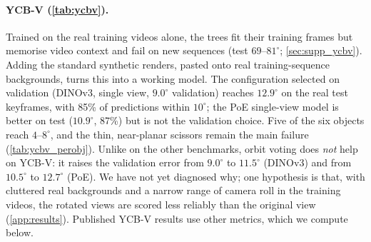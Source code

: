 \paragraph{YCB-V (\cref{tab:ycbv}).} Trained on the real training videos alone, the trees fit their training frames but memorise video context and fail on new sequences (test $69$--$81^\circ$; \cref{sec:supp_ycbv}). Adding the standard synthetic renders, pasted onto real training-sequence backgrounds, turns this into a working model. The configuration selected on validation (DINOv3, single view, $9.0^\circ$ validation) reaches $12.9^\circ$ on the real test keyframes, with 85\% of predictions within $10^\circ$; the PoE single-view model is better on test ($10.9^\circ$, 87\%) but is not the validation choice. Five of the six objects reach $4$--$8^\circ$, and the thin, near-planar scissors remain the main failure (\cref{tab:ycbv_perobj}). Unlike on the other benchmarks, orbit voting does \emph{not} help on YCB-V: it raises the validation error from $9.0^\circ$ to $11.5^\circ$ (DINOv3) and from $10.5^\circ$ to $12.7^\circ$ (PoE). We have not yet diagnosed why; one hypothesis is that, with cluttered real backgrounds and a narrow range of camera roll in the training videos, the rotated views are scored less reliably than the original view (\cref{app:results}). Published YCB-V results use other metrics, which we compute below.

\begin{table}[t]
  \centering\footnotesize
  \setlength{\tabcolsep}{3.5pt}
  \resizebox{\linewidth}{!}{}
  \caption{\textbf{YCB-V with the literature's metrics} (\%, higher is better), per object on the standard real keyframes. Published rows come from each paper's own tables, $^\ddagger$\,through the table of~\cite{wang2021gdrnet}. These six objects are non-symmetric in this protocol, so ADD(-S) equals ADD for them. ``Mean (6)'' is our average of the published per-object values over our six objects; ``mean (21)'' is the published mean over all 21 objects, which includes symmetric objects and is not comparable with mean (6). Ours: DINOv3 tree, 1 view, predicted rotation and translation, \emph{ground-truth crops}, 3 seeds; the $\pm$ is the seed standard deviation of the 6-object mean. Published rows use a detector or initial pose, so the crop difference favours ours. AUC values are not fully comparable across papers: ZebraPose reports $90.1/85.3$ with all-point interpolation and $94.0/89.8$ with 11-point interpolation~\cite{su2022zebrapose}; ours integrates on a 1\,mm grid. Instance-pooled, ours is $84.8$ (AUC ADD), $92.1$ (AUC ADD-S) and $76.6$ (ADD at $0.1d$).}
  \label{tab:ycbv_lit}
\end{table}

